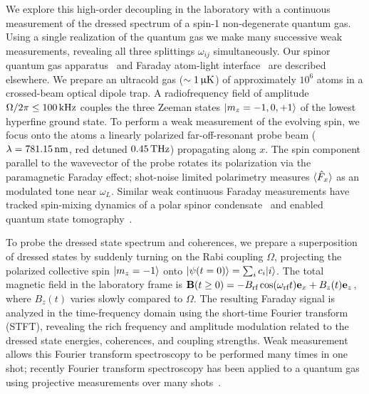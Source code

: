 \documentclass[aps,prl,reprint,superscriptaddress,floatfix]{revtex4-1}
\begin{document}
We explore this high-order decoupling in the laboratory with a continuous measurement of the dressed spectrum of a spin-1 non-degenerate quantum gas.
Using a single realization of the quantum gas we make many successive weak measurements, revealing all three splittings $\omega_{ij}$ simultaneously.
Our spinor quantum gas apparatus~\cite{wood_magnetic_2015} and Faraday atom-light interface~\cite{jasperse_magic-wavelength_2017} are described elsewhere.
We prepare an ultracold gas ($\sim \unit[1]{\upmu K}$) of approximately $10^6$ \Rb atoms in a crossed-beam optical dipole trap.
A radiofrequency field of amplitude $\Omega/2\pi \leq \unit[100]{kHz}$ couples the three Zeeman states $\vert m_z=-1,0,+1 \rangle $ of the lowest hyperfine ground state.
To perform a weak measurement of the evolving spin, we focus onto the atoms a linearly polarized far-off-resonant probe beam ($\lambda=\unit[781.15]{nm}$, red detuned $\unit[0.45]{THz}$) propagating along $x$.
The spin component parallel to the wavevector of the probe rotates its polarization via the paramagnetic Faraday effect; shot-noise limited polarimetry measures $\langle \hat{F}_x \rangle$ as an modulated tone near $\omega_L$.
Similar weak continuous Faraday measurements have tracked spin-mixing dynamics of a polar spinor condensate~\cite{liu_quantum_2009} and enabled quantum state tomography~\cite{smith_continuous_2004,smith_efficient_2006}.

To probe the dressed state spectrum and coherences, we prepare a superposition of dressed states by suddenly turning on the Rabi coupling $\Omega$, projecting the polarized collective spin $\vert m_z=-1 \rangle $ onto $\vert \psi(t=0) \rangle  = \sum_i c_i \vert i \rangle $.
The total magnetic field in the laboratory frame is $\mathbf{B}(t \geq 0) = -B_{\text{rf}} \cos (\omega_{\text{rf}} t) \mathbf{e}_x + B_z(t) \mathbf{e}_z$, where $B_z(t)$ varies slowly compared to $\Omega$.
The resulting Faraday signal is analyzed in the time-frequency domain using the short-time Fourier transform (STFT), revealing the rich frequency and amplitude modulation related to the dressed state energies, coherences, and coupling strengths.
Weak measurement allows this Fourier transform spectroscopy to be performed many times in one shot; recently Fourier transform spectroscopy has been applied to a quantum gas using projective measurements over many shots~\cite{valdes-curiel_fourier_2017}.
\end{document}
